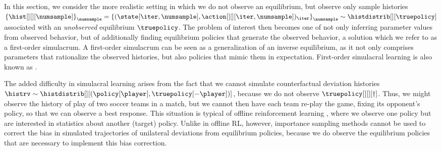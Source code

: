 In this section, we consider the more realistic setting in which we do not observe an equilibrium, but observe only sample histories $\left\{ \hist[][][\numsample] \right\}_{\numsample} = \left\{(\state[\iter, \numsample], \action[][][\iter, \numsample])_\iter \right\}_{\numsample} \sim \histdistrib[][\truepolicy]$ associated with an \emph{unobserved\/} equilibrium $\truepolicy$. 
The problem of interest then becomes one of not only inferring parameter values from observed behavior, but of additionally finding equilibrium policies that generate the observed behavior, a solution which we refer to as a first-order simulacrum.
A first-order simulacrum can be seen as a generalization of an inverse equilibrium, as it not only comprises parameters that rationalize the observed histories, but also policies that mimic them in expectation.
First-order simulacral learning is also known as  \citep{abbeel2004apprenticeship, yang2020inferring}.

 


The added difficulty in simulacral learning arises from the fact that we cannot simulate counterfactual deviation histories $\histrv \sim \histdistrib[][{(\policy[\player], \truepolicy[-\player])}]$, because we do not observe $\truepolicy[][][\dagger]$.
Thus, we might observe the history of play of two soccer teams in a match, but we cannot then have each team re-play the game, fixing its opponent's policy, so that we can observe a best response.
 
This situation is typical of offline reinforcement learning \citep{levine2020offline, jarboui2021offline}, where we observe one policy but are interested in statistics about another (target) policy.
Unlike in offline RL, however, importance sampling methods cannot be used to correct the bias in simulated  trajectories of unilateral deviations from equilibrium policies, because we do observe the equilibrium policies that are necessary to implement this bias correction. 
\fi


